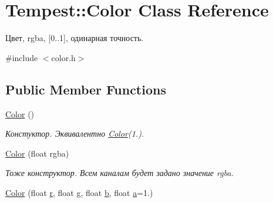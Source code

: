\hypertarget{class_tempest_1_1_color}{\section{Tempest\+:\+:Color Class Reference}
\label{class_tempest_1_1_color}
}


Цвет, rgba, \mbox{[}0..1\mbox{]}, одинарная точность.  




{\ttfamily \#include $<$color.\+h$>$}

\subsection*{Public Member Functions}
\begin{DoxyCompactItemize}
\item 
\hypertarget{class_tempest_1_1_color_a9a742cbe9f9f4037f5d9f4e81a9b2428}{\hyperlink{class_tempest_1_1_color_a9a742cbe9f9f4037f5d9f4e81a9b2428}{Color} ()}\label{class_tempest_1_1_color_a9a742cbe9f9f4037f5d9f4e81a9b2428}

\begin{DoxyCompactList}\small\item\em Констуктор. Эквивалентно \hyperlink{class_tempest_1_1_color}{Color}(1.). \end{DoxyCompactList}\item 
\hypertarget{class_tempest_1_1_color_a4570f17f449c0302fd4c2964989ff65d}{\hyperlink{class_tempest_1_1_color_a4570f17f449c0302fd4c2964989ff65d}{Color} (float rgba)}\label{class_tempest_1_1_color_a4570f17f449c0302fd4c2964989ff65d}

\begin{DoxyCompactList}\small\item\em Тоже конструктор. Всем каналам будет задано значение rgba. \end{DoxyCompactList}\item 
\hypertarget{class_tempest_1_1_color_a1ff48fafaffb35cdbf0d8384fc48e7e9}{\hyperlink{class_tempest_1_1_color_a1ff48fafaffb35cdbf0d8384fc48e7e9}{Color} (float \hyperlink{class_tempest_1_1_color_ad6d7d14e2251970ddc32a3845c2adc46}{r}, float \hyperlink{class_tempest_1_1_color_a7dd31a26074d75037eb72979d11f9a87}{g}, float \hyperlink{class_tempest_1_1_color_a3c9641a1dee2770f28c167ff6866158c}{b}, float \hyperlink{class_tempest_1_1_color_ac36ada4151d5898dea335ebf8b1cd21b}{a}=1.)}\label{class_tempest_1_1_color_a1ff48fafaffb35cdbf0d8384fc48e7e9}


\end{DoxyCompactItemize}
